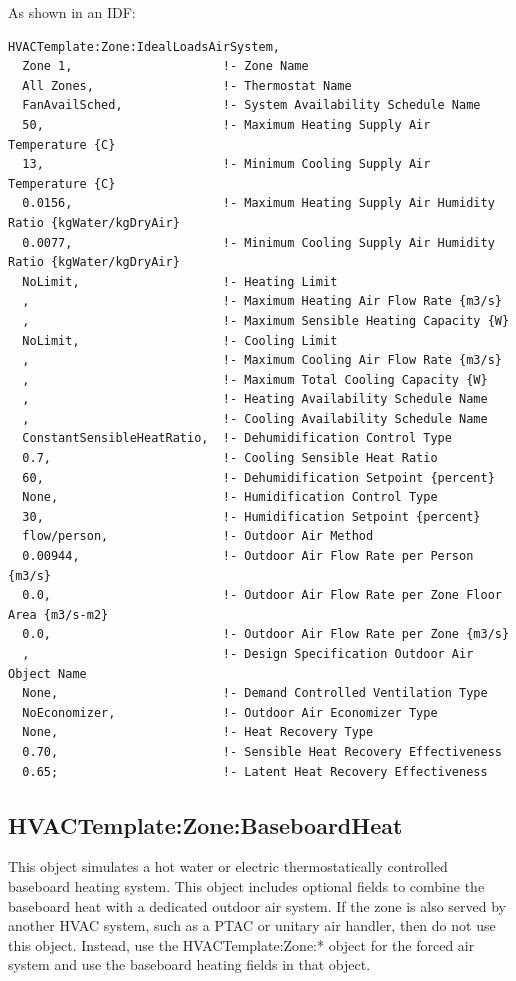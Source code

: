 As shown in an IDF:

\begin{lstlisting}
HVACTemplate:Zone:IdealLoadsAirSystem,
  Zone 1,                     !- Zone Name
  All Zones,                  !- Thermostat Name
  FanAvailSched,              !- System Availability Schedule Name
  50,                         !- Maximum Heating Supply Air Temperature {C}
  13,                         !- Minimum Cooling Supply Air Temperature {C}
  0.0156,                     !- Maximum Heating Supply Air Humidity Ratio {kgWater/kgDryAir}
  0.0077,                     !- Minimum Cooling Supply Air Humidity Ratio {kgWater/kgDryAir}
  NoLimit,                    !- Heating Limit
  ,                           !- Maximum Heating Air Flow Rate {m3/s}
  ,                           !- Maximum Sensible Heating Capacity {W}
  NoLimit,                    !- Cooling Limit
  ,                           !- Maximum Cooling Air Flow Rate {m3/s}
  ,                           !- Maximum Total Cooling Capacity {W}
  ,                           !- Heating Availability Schedule Name
  ,                           !- Cooling Availability Schedule Name
  ConstantSensibleHeatRatio,  !- Dehumidification Control Type
  0.7,                        !- Cooling Sensible Heat Ratio
  60,                         !- Dehumidification Setpoint {percent}
  None,                       !- Humidification Control Type
  30,                         !- Humidification Setpoint {percent}
  flow/person,                !- Outdoor Air Method
  0.00944,                    !- Outdoor Air Flow Rate per Person {m3/s}
  0.0,                        !- Outdoor Air Flow Rate per Zone Floor Area {m3/s-m2}
  0.0,                        !- Outdoor Air Flow Rate per Zone {m3/s}
  ,                           !- Design Specification Outdoor Air Object Name
  None,                       !- Demand Controlled Ventilation Type
  NoEconomizer,               !- Outdoor Air Economizer Type
  None,                       !- Heat Recovery Type
  0.70,                       !- Sensible Heat Recovery Effectiveness
  0.65;                       !- Latent Heat Recovery Effectiveness
\end{lstlisting}

\subsection{HVACTemplate:Zone:BaseboardHeat}\label{hvactemplatezonebaseboardheat}

This object simulates a hot water or electric thermostatically controlled baseboard heating system. This object includes optional fields to combine the baseboard heat with a dedicated outdoor air system. If the zone is also served by another HVAC system, such as a PTAC or unitary air handler, then do not use this object. Instead, use the HVACTemplate:Zone:* object for the forced air system and use the baseboard heating fields in that object.


